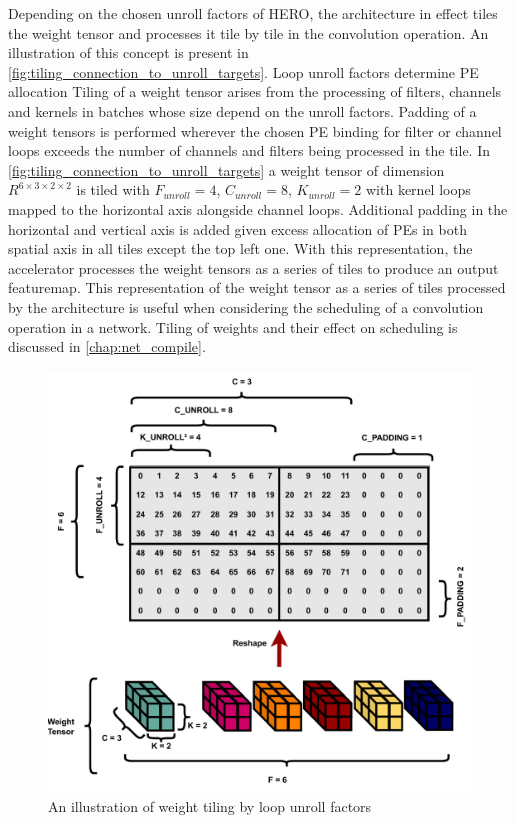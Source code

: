 Depending on the chosen unroll factors of HERO, the architecture in effect tiles
the weight tensor and processes it tile by tile in the convolution operation. An
illustration of this concept is present in
\autoref{fig:tiling_connection_to_unroll_targets}. Loop unroll factors determine
PE allocation Tiling of a weight tensor arises from the processing of filters,
channels and kernels in batches whose size depend on the unroll factors. Padding
of a weight tensors is performed wherever the chosen PE binding for filter or
channel loops exceeds the number of channels and filters being processed in the
tile. In \autoref{fig:tiling_connection_to_unroll_targets} a weight tensor of
dimension $R^{6\times 3\times 2\times 2}$ is tiled with $F_{unroll} = 4$,
$C_{unroll}=8$, $K_{unroll}=2$ with kernel loops mapped to the horizontal axis
alongside channel loops. Additional padding in the horizontal and vertical axis
is added given excess allocation of PEs in both spatial axis in all tiles except
the top left one. With this representation, the accelerator processes the weight
tensors as a series of tiles to produce an output featuremap.    
This representation of the weight tensor as a series of tiles processed by the
architecture is useful when considering the scheduling of a convolution
operation in a network. Tiling of weights and their effect on scheduling is
discussed in \autoref{chap:net_compile}.

\begin{figure}[]
    \centering
    \includegraphics[scale=0.5]{fig/tiling.pdf}
    \caption{An illustration of weight tiling by loop unroll factors}
    \label{fig:tiling_connection_to_unroll_targets}
\end{figure}

